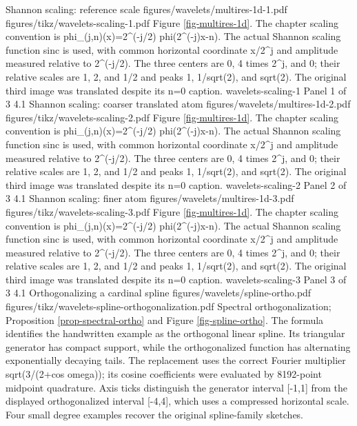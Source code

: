 {Shannon scaling: reference scale}
{figures/wavelets/multires-1d-1.pdf}
{figures/tikz/wavelets-scaling-1.pdf}
{Figure \ref{fig-multires-1d}.}
{The chapter scaling convention is phi\_(j,n)(x)=2\textasciicircum{}(-j/2) phi(2\textasciicircum{}(-j)x-n). The actual Shannon scaling function sinc is used, with common horizontal coordinate x/2\textasciicircum{}j and amplitude measured relative to 2\textasciicircum{}(-j/2). The three centers are 0, 4 times 2\textasciicircum{}j, and 0; their relative scales are 1, 2, and 1/2 and peaks 1, 1/sqrt(2), and sqrt(2). The original third image was translated despite its n=0 caption.}
{wavelets-scaling-1}
{Panel 1 of 3}
{4.1}
{Shannon scaling: coarser translated atom}
{figures/wavelets/multires-1d-2.pdf}
{figures/tikz/wavelets-scaling-2.pdf}
{Figure \ref{fig-multires-1d}.}
{The chapter scaling convention is phi\_(j,n)(x)=2\textasciicircum{}(-j/2) phi(2\textasciicircum{}(-j)x-n). The actual Shannon scaling function sinc is used, with common horizontal coordinate x/2\textasciicircum{}j and amplitude measured relative to 2\textasciicircum{}(-j/2). The three centers are 0, 4 times 2\textasciicircum{}j, and 0; their relative scales are 1, 2, and 1/2 and peaks 1, 1/sqrt(2), and sqrt(2). The original third image was translated despite its n=0 caption.}
{wavelets-scaling-2}
{Panel 2 of 3}
{4.1}
{Shannon scaling: finer atom}
{figures/wavelets/multires-1d-3.pdf}
{figures/tikz/wavelets-scaling-3.pdf}
{Figure \ref{fig-multires-1d}.}
{The chapter scaling convention is phi\_(j,n)(x)=2\textasciicircum{}(-j/2) phi(2\textasciicircum{}(-j)x-n). The actual Shannon scaling function sinc is used, with common horizontal coordinate x/2\textasciicircum{}j and amplitude measured relative to 2\textasciicircum{}(-j/2). The three centers are 0, 4 times 2\textasciicircum{}j, and 0; their relative scales are 1, 2, and 1/2 and peaks 1, 1/sqrt(2), and sqrt(2). The original third image was translated despite its n=0 caption.}
{wavelets-scaling-3}
{Panel 3 of 3}
{4.1}
{Orthogonalizing a cardinal spline}
{figures/wavelets/spline-ortho.pdf}
{figures/tikz/wavelets-spline-orthogonalization.pdf}
{Spectral orthogonalization; Proposition \ref{prop-spectral-ortho} and Figure \ref{fig-spline-ortho}.}
{The formula identifies the handwritten example as the orthogonal linear spline. Its triangular generator has compact support, while the orthogonalized function has alternating exponentially decaying tails. The replacement uses the correct Fourier multiplier sqrt(3/(2+cos omega)); its cosine coefficients were evaluated by 8192-point midpoint quadrature. Axis ticks distinguish the generator interval [-1,1] from the displayed orthogonalized interval [-4,4], which uses a compressed horizontal scale. Four small degree examples recover the original spline-family sketches.}

